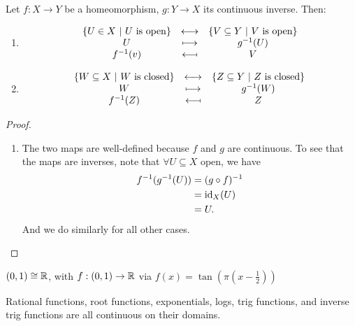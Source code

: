 \documentclass[12pt, twosided]{article}
\begin{document}
\begin{prop}
  Let \(f: X \to Y\) be a homeomorphism, \(g: Y \to X\) its continuous inverse. Then:
  \begin{enumerate}
  \item \[
      \begin{matrix}
        \left\{ U \in X \ \middle\vert\  U \text{ is open} \right\} & \longleftrightarrow & \left\{ V \subseteq Y \ \middle\vert\  V \text{ is open}\right\} \\
        U & \longmapsto & g^{-1}(U) \\
        f^{-1}(v) & \longmapsfrom & V
      \end{matrix}
    \]
  \item \[
      \begin{matrix}
        \left\{ W \subseteq X \ \middle\vert\  W \text{ is closed} \right\} & \longleftrightarrow & \left\{ Z \subseteq Y \ \middle\vert\  Z \text{ is closed} \right\} \\
        W & \longmapsto & g^{-1}(W) \\
        f^{-1}(Z) & \longmapsfrom & Z
      \end{matrix}
    \]
  \end{enumerate}
\end{prop}

\begin{proof}
  \begin{enumerate}
  \item The two maps are well-defined because \(f\) and \(g\) are continuous. To see that the maps are inverses, note that \(\forall U \subseteq X\) open, we have
    \begin{align*}
      f^{-1}(g^{-1}(U)) &= (g \circ f)^{-1} \\
                  &= \mathrm{id}_X(U) \\
                  &= U.
    \end{align*}
    And we do similarly for all other cases.
  \end{enumerate}
\end{proof}

\begin{exa}
  \((0, 1) \cong \mathbb{R}\), with \(f: (0, 1) \to \mathbb{R}\) via \(f(x) = \tan\left(\pi\left(x - \frac{1}{2}\right)\right)\)
\end{exa}

\begin{lm}
  Rational functions, root functions, exponentials, logs, trig functions, and inverse trig functions are all continuous on their domains.
\end{lm}
\end{document}
